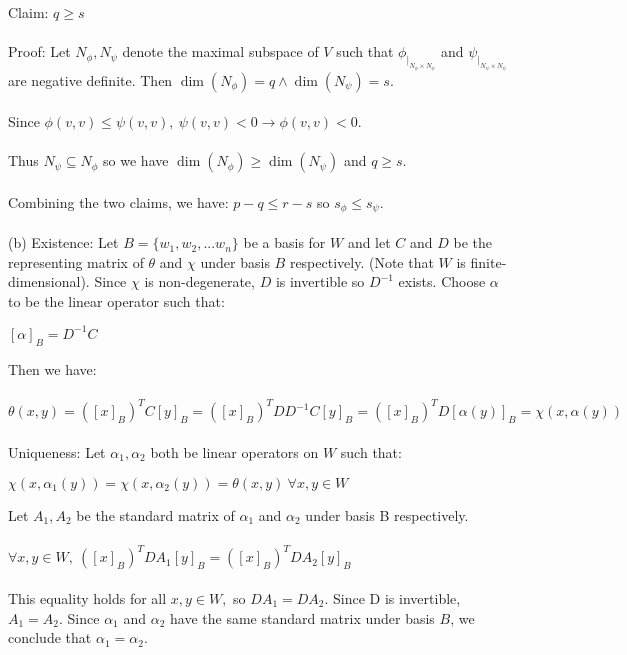 \documentclass{article}
\begin{document}
Claim: $q\geq s$\\\\
Proof: Let $N_\phi,N_\psi$ denote the maximal subspace of $V$ such that $\phi_{|_{N_\phi\times N_\phi}}$ and $\psi_{|_{N_\psi\times N_\psi}}$ are negative definite. Then $\dim(N_\phi) = q \land \dim(N_\psi) = s$.\\\\
Since $\phi(v,v) \leq \psi(v,v),\  \psi(v,v) < 0 \to \phi(v,v) < 0$.\\\\Thus $ N_\psi \subseteq N_\phi$ so we have $\dim(N_\phi) \geq \dim(N_\psi)$ and $q\geq s$.\\\\
Combining the two claims, we have: $p-q\leq r-s $ so $s_\phi \leq s_\psi$.\\\\
(b) Existence: Let $B=\{w_1,w_2,...w_n\}$ be a basis for $W$ and let $C$ and $D$ be the representing matrix of $\theta$ and $\chi$ under basis $B$ respectively. (Note that $W$ is finite-dimensional). Since $\chi$ is non-degenerate, $D$ is invertible so $D^{-1}$ exists. Choose $\alpha$ to be the linear operator such that:\begin{center}
    $[\alpha]_B = D^{-1}C$
\end{center}
Then we have:\\\\ $\theta(x,y) = ([x]_B)^TC[y]_B = ([x]_B)^TDD^{-1}C[y]_B = ([x]_B)^TD[\alpha(y)]_B = \chi(x,\alpha(y))$\\\\
Uniqueness: Let $\alpha_1,\alpha_2$ both be linear operators on $W$ such that:\begin{center}
    $\chi(x,\alpha_1(y)) = \chi(x,\alpha_2(y)) = \theta(x,y)\ \forall x,y\in W$ 
\end{center}
Let $A_1,A_2$ be the standard matrix of $\alpha_1$ and $\alpha_2$ under basis B respectively.\\\\
$\forall x,y\in W, \ ([x]_B)^TDA_1[y]_B = ([x]_B)^TDA_2[y]_B$\\\\
This equality holds for all $x,y \in W,$ so $ DA_1 = DA_2.$ Since D is invertible, $A_1 = A_2$.  Since $\alpha_1$ and $\alpha_2$ have the same standard matrix under basis $B$, we conclude that $\alpha_1 = \alpha_2$.
\end{document}
